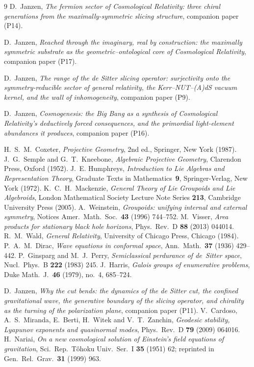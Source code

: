 \documentclass[11pt,a4paper]{article}
\theoremstyle{definition}
\begin{document}
\begin{thebibliography}{9}
D.~Janzen,
\emph{The fermion sector of Cosmological Relativity: three chiral generations from the maximally-symmetric slicing structure}, companion paper (P14).

D.~Janzen,
\emph{Reached through the imaginary, real by construction: the maximally symmetric substrate as the geometric--ontological core of Cosmological Relativity}, companion paper (P17).

D.~Janzen,
\emph{The range of the de Sitter slicing operator: surjectivity onto the symmetry-reducible sector of general relativity, the Kerr--NUT--(A)dS vacuum kernel, and the wall of inhomogeneity}, companion paper (P9).

 D.~Janzen, \emph{Cosmogenesis: the Big Bang as a synthesis of Cosmological Relativity's deductively forced consequences, and the primordial light-element abundances it produces}, companion paper (P16).

 H.~S.~M.~Coxeter, \emph{Projective Geometry}, 2nd ed., Springer, New York (1987).
 J.~G.~Semple and G.~T.~Kneebone, \emph{Algebraic Projective Geometry}, Clarendon Press, Oxford (1952).
J.~E. Humphreys,
\emph{Introduction to Lie Algebras and Representation Theory},
Graduate Texts in Mathematics~\textbf{9}, Springer-Verlag, New York (1972).
 K.~C.~H.~Mackenzie, \emph{General Theory of Lie Groupoids and Lie Algebroids}, London Mathematical Society Lecture Note Series \textbf{213}, Cambridge University Press (2005).
 A.~Weinstein, \emph{Groupoids: unifying internal and external symmetry}, Notices Amer.\ Math.\ Soc.\ \textbf{43} (1996) 744--752.
 M.~Visser, \emph{Area products for stationary black hole horizons}, Phys.\ Rev.\ D \textbf{88} (2013) 044014.
 R.~M.~Wald, \emph{General Relativity}, University of Chicago Press, Chicago (1984).
 P.~A.~M.~Dirac, \emph{Wave equations in conformal space}, Ann.\ Math.\ \textbf{37} (1936) 429--442.
 P.~Ginsparg and M.~J.~Perry, \emph{Semiclassical perdurance of de~Sitter space}, Nucl.\ Phys.\ B \textbf{222} (1983) 245.
 J.~Harris, \emph{Galois groups of enumerative problems}, Duke Math.\ J.\ \textbf{46} (1979), no.~4, 685--724.

 D.~Janzen, \emph{Why the cut bends: the dynamics of the de Sitter cut, the confined gravitational wave, the generative boundary of the slicing operator, and chirality as the turning of the polarization plane}, companion paper (P11).
 V.~Cardoso, A.~S.~Miranda, E.~Berti, H.~Witek and V.~T.~Zanchin, \emph{Geodesic stability, Lyapunov exponents and quasinormal modes}, Phys.\ Rev.\ D \textbf{79} (2009) 064016.
 H.~Nariai, \emph{On a new cosmological solution of Einstein's field equations of gravitation}, Sci.\ Rep.\ T\^ohoku Univ.\ Ser.\ I \textbf{35} (1951) 62; reprinted in Gen.\ Rel.\ Grav.\ \textbf{31} (1999) 963.
\end{thebibliography}



\end{document}
